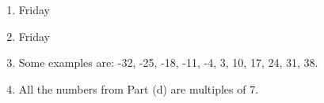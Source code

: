 \documentclass[11pt]{article}
\begin{document}
\begin{enumerate}
\begin{multicols}{2}
\begin{enumerate}
\item Friday

\item Friday
\end{enumerate}
\end{multicols}

\begin{enumerate}
\setcounter{enumii}{2}
\item Some examples are: -32, -25, -18, -11, -4, 3, 10, 17, 24, 31, 38.

\addtocounter{enumii}{1}
\item All the numbers from Part (d) are multiples of 7.
\end{enumerate}

\end{enumerate}
\hbreak
\end{document}
